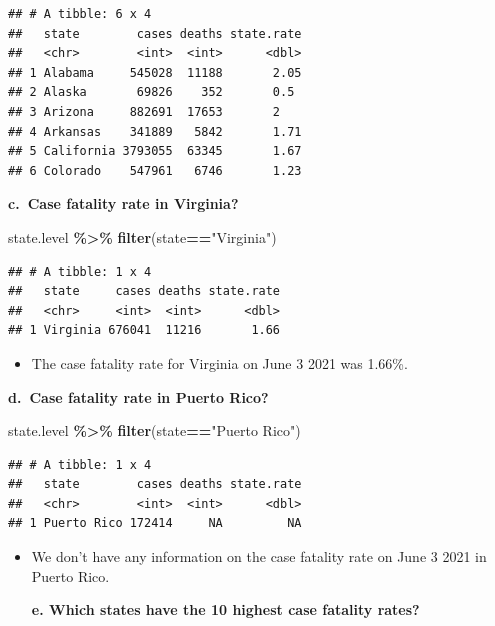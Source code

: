 \documentclass[
  openany]{book}
\newenvironment{Shaded}{\begin{snugshade}}{\end{snugshade}}
\newcommand{\FunctionTok}[1]{\textcolor[rgb]{0.13,0.29,0.53}{\textbf{#1}}}
\newcommand{\NormalTok}[1]{#1}
\newcommand{\SpecialCharTok}[1]{\textcolor[rgb]{0.81,0.36,0.00}{\textbf{#1}}}
\newcommand{\StringTok}[1]{\textcolor[rgb]{0.31,0.60,0.02}{#1}}
\providecommand{\tightlist}{%
  \setlength{\itemsep}{0pt}\setlength{\parskip}{0pt}}
\begin{document}
\begin{verbatim}
## # A tibble: 6 x 4
##   state        cases deaths state.rate
##   <chr>        <int>  <int>      <dbl>
## 1 Alabama     545028  11188       2.05
## 2 Alaska       69826    352       0.5 
## 3 Arizona     882691  17653       2   
## 4 Arkansas    341889   5842       1.71
## 5 California 3793055  63345       1.67
## 6 Colorado    547961   6746       1.23
\end{verbatim}

\textbf{c.~Case fatality rate in Virginia?}

\begin{Shaded}
\begin{Highlighting}[]
\NormalTok{state.level }\SpecialCharTok{\%\textgreater{}\%} 
  \FunctionTok{filter}\NormalTok{(state}\SpecialCharTok{==}\StringTok{"Virginia"}\NormalTok{)}
\end{Highlighting}
\end{Shaded}

\begin{verbatim}
## # A tibble: 1 x 4
##   state     cases deaths state.rate
##   <chr>     <int>  <int>      <dbl>
## 1 Virginia 676041  11216       1.66
\end{verbatim}

\begin{itemize}
\tightlist
\item
  The case fatality rate for Virginia on June 3 2021 was 1.66\%.
\end{itemize}

\textbf{d.~Case fatality rate in Puerto Rico?}

\begin{Shaded}
\begin{Highlighting}[]
\NormalTok{state.level }\SpecialCharTok{\%\textgreater{}\%} 
  \FunctionTok{filter}\NormalTok{(state}\SpecialCharTok{==}\StringTok{"Puerto Rico"}\NormalTok{)}
\end{Highlighting}
\end{Shaded}

\begin{verbatim}
## # A tibble: 1 x 4
##   state        cases deaths state.rate
##   <chr>        <int>  <int>      <dbl>
## 1 Puerto Rico 172414     NA         NA
\end{verbatim}

\begin{itemize}
\item
  We don't have any information on the case fatality rate on June 3 2021 in Puerto Rico.

  \textbf{e. Which states have the 10 highest case fatality rates?}
\end{itemize}
\end{document}
